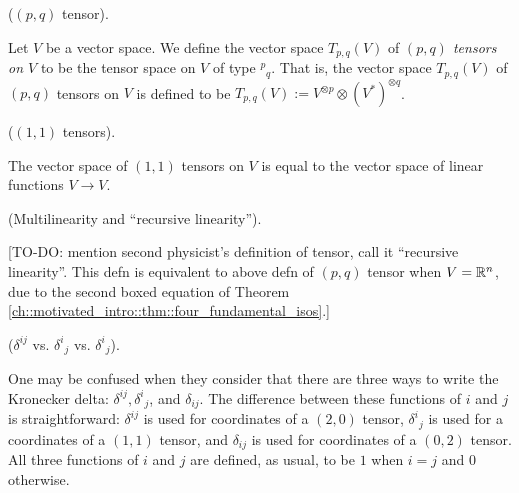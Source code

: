 \begin{defn}
    \label{ch::motivated_intro::defn::pq_tensor}
    
    ($(p, q)$ tensor).
    
    Let $V$ be a vector space. We define the vector space $T_{p,q}(V)$ of \textit{$(p, q)$ tensors on $V$} to be the tensor space on $V$ of type $^p{}_q$. That is, the vector space $T_{p,q}(V)$ of $(p, q)$ tensors on $V$ is defined to be $T_{p,q}(V) := V^{\otimes p} \otimes (V^*)^{\otimes q}$.
\end{defn}

\begin{remark}
    ($(1, 1)$ tensors).
    
    The vector space of $(1, 1)$ tensors on $V$ is equal to the vector space of linear functions $V \rightarrow V$.
\end{remark}

\begin{remark}
    (Multilinearity and ``recursive linearity'').
    
    [TO-DO: mention second physicist's definition of tensor, call it ``recursive linearity''. This defn is equivalent to above defn of $(p, q)$ tensor when $V = \mathbb{R}^n$, due to the second boxed equation of Theorem \ref{ch::motivated_intro::thm::four_fundamental_isos}.]
\end{remark}

\begin{remark}
    ($\delta^{ij}$ vs. $\delta^i{}_j$ vs. $\delta^i{}_j$).
    
    One may be confused when they consider that there are three ways to write the Kronecker delta: $\delta^{ij}, \delta^i{}_j$, and $\delta_{ij}$. The difference between these functions of $i$ and $j$ is straightforward: $\delta^{ij}$ is used for coordinates of a $(2, 0)$ tensor, $\delta^i{}_j$ is used for a coordinates of a $(1, 1)$ tensor, and $\delta_{ij}$ is used for coordinates of a $(0, 2)$ tensor. All three functions of $i$ and $j$ are defined, as usual, to be $1$ when $i = j$ and $0$ otherwise.
\end{remark}

